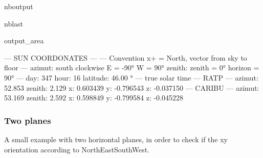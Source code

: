 \documentclass[letterpaper,10pt,english]{sphinxmanual}
\begin{document}
\begin{sphinxuseclass}{nboutput}
\begin{sphinxuseclass}{nblast}
{\begin{sphinxuseclass}{output_area}
\begin{sphinxuseclass}{}
\begin{sphinxVerbatim}[commandchars=\\\{\}]
---      SUN COORDONATES         ---
--- Convention x+ = North, vector from sky to floor
--- azimut: south clockwise E = -90° W = 90°     zenith:                                 zenith = 0° horizon = 90°
--- day: 347     hour: 16        latitude: 46.00 °
--- true solar time
--- RATP ---
         azimut: 52.853          zenith: 2.129
         x: 0.603439     y: -0.796543    z: -0.037150
--- CARIBU ---
         azimut: 53.169          zenith: 2.592
         x: 0.598849     y: -0.799584    z: -0.045228


\end{sphinxVerbatim}



\end{sphinxuseclass}
\end{sphinxuseclass}
}

\end{sphinxuseclass}
\end{sphinxuseclass}

\subsubsection{Two planes}
\label{\detokenize{more_examples:Two-planes}}
\sphinxAtStartPar
A small example with two horizontal planes, in order to check if the xy orientation according to North\sphinxhyphen{}East\sphinxhyphen{}South\sphinxhyphen{}West.
\end{document}

